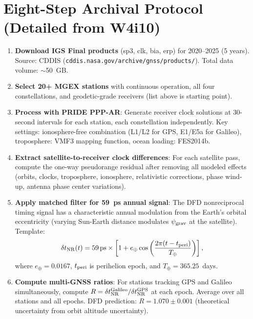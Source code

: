 \documentclass[11pt]{article}
\begin{document}
\section{Eight-Step Archival Protocol (Detailed from W4i10)}

\begin{enumerate}[label=\textbf{Step \arabic*:}]
\item \textbf{Download IGS Final products} (sp3, clk, bia, erp) for
  2020--2025 (5 years). Source: CDDIS (\texttt{cddis.nasa.gov/archive/gnss/products/}).
  Total data volume: $\sim$50~GB.

\item \textbf{Select 20+ MGEX stations} with continuous operation, all four
  constellations, and geodetic-grade receivers (list above is starting point).

\item \textbf{Process with PRIDE PPP-AR}: Generate receiver clock
  solutions at 30-second intervals for each station, each constellation
  independently. Key settings: ionosphere-free combination (L1/L2 for GPS,
  E1/E5a for Galileo), troposphere: VMF3 mapping function, ocean loading:
  FES2014b.

\item \textbf{Extract satellite-to-receiver clock differences}: For each
  satellite pass, compute the one-way pseudorange residual after removing
  all modeled effects (orbits, clocks, troposphere, ionosphere, relativistic
  corrections, phase wind-up, antenna phase center variations).

\item \textbf{Apply matched filter for 59~ps annual signal}: The DFD
  nonreciprocal timing signal has a characteristic annual modulation
  from the Earth's orbital eccentricity (varying Sun-Earth distance
  modulates $\psi_{\rm grav}$ at the satellite). Template:
  \begin{equation}
  \delta t_{\rm NR}(t) = 59\,\text{ps} \times
  \left[1 + e_\oplus \cos\left(\frac{2\pi(t - t_{\rm peri})}{T_\oplus}\right)\right],
  \end{equation}
  where $e_\oplus = 0.0167$, $t_{\rm peri}$ is perihelion epoch, and
  $T_\oplus = 365.25$~days.

\item \textbf{Compute multi-GNSS ratios}: For stations tracking GPS and
  Galileo simultaneously, compute $R = \delta t_{\rm NR}^{\rm Galileo}/
  \delta t_{\rm NR}^{\rm GPS}$ at each epoch. Average over all stations
  and all epochs. DFD prediction: $R = 1.070 \pm 0.001$ (theoretical
  uncertainty from orbit altitude uncertainty).


\end{enumerate}
\end{document}
